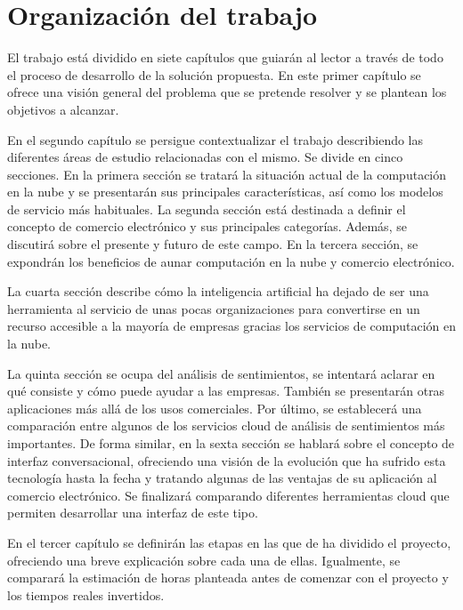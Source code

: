 \section {Organización del trabajo}

El trabajo está dividido en siete capítulos que guiarán al lector a través de todo el proceso de desarrollo de la solución propuesta. En este primer capítulo se ofrece una visión general del problema que se pretende resolver y se plantean los objetivos a alcanzar.

\newpage
 
En el segundo capítulo se persigue contextualizar el trabajo describiendo las diferentes áreas de estudio relacionadas con el mismo. Se divide en cinco secciones. En la primera sección se tratará la situación actual de la computación en la nube y se presentarán sus principales características, así como los modelos de servicio más habituales. La segunda sección está destinada a definir el concepto de comercio electrónico y sus principales categorías. Además, se discutirá sobre el presente y futuro de este campo. En la tercera sección, se expondrán los beneficios de aunar computación en la nube y comercio electrónico.

La cuarta sección describe cómo la inteligencia artificial ha dejado de ser una herramienta al servicio de unas pocas organizaciones para convertirse en un recurso accesible a la mayoría de empresas gracias los servicios de computación en la nube.

La quinta sección se ocupa del análisis de sentimientos, se intentará aclarar en qué consiste y  cómo puede ayudar a las empresas. También se presentarán otras aplicaciones más allá de los usos comerciales. Por último, se establecerá una comparación entre algunos de los servicios cloud de análisis de sentimientos más importantes. De forma similar, en la sexta sección se hablará sobre el concepto de interfaz conversacional, ofreciendo una visión de la evolución que ha sufrido esta tecnología hasta la fecha y tratando algunas de las ventajas de su aplicación al comercio electrónico. Se finalizará comparando diferentes herramientas cloud que permiten desarrollar una interfaz de este tipo.

En el tercer capítulo se definirán las etapas en las que de ha dividido el proyecto, ofreciendo una breve explicación sobre cada una de ellas. Igualmente, se comparará la estimación de horas planteada antes de comenzar con el proyecto y los tiempos reales invertidos.

